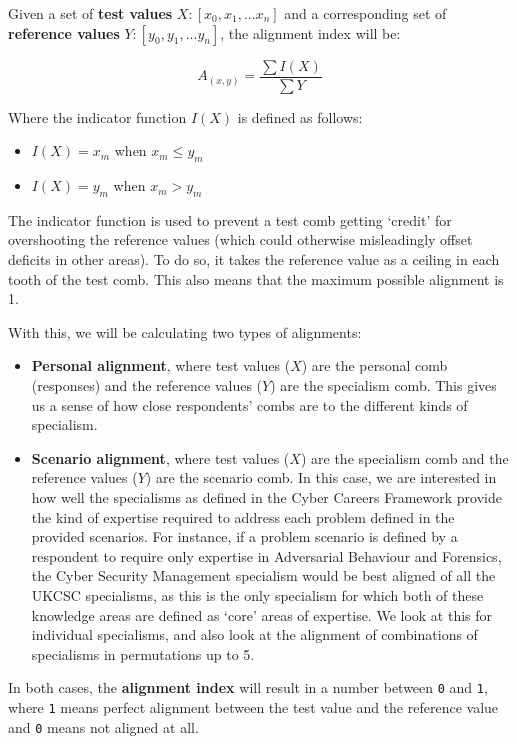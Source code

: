 \documentclass[
  a4paper,
]{book}
\providecommand{\tightlist}{%
  \setlength{\itemsep}{0pt}\setlength{\parskip}{0pt}}
\begin{document}
Given a set of \textbf{test values} \(X:[x_0, x_1, ... x_n ]\) and a
corresponding set of \textbf{reference values}
\(Y:[y_0, y_1, ... y_n ]\), the alignment index will be:

\[
A_{(x,y)} = \frac{\sum I(X)}{\sum Y}
\]

Where the indicator function \(I(X)\) is defined as follows:

\begin{itemize}
\tightlist
\item
  \(I(X) = x_m\) when \(x_m \leq y_m\)
\item
  \(I(X) = y_m\) when \(x_m > y_m\)
\end{itemize}

The indicator function is used to prevent a test comb getting `credit'
for overshooting the reference values (which could otherwise
misleadingly offset deficits in other areas). To do so, it takes the
reference value as a ceiling in each tooth of the test comb. This also
means that the maximum possible alignment is 1.

With this, we will be calculating two types of alignments:

\begin{itemize}
\item
  \textbf{Personal alignment}, where test values (\(X\)) are the
  personal comb (responses) and the reference values (\(Y\)) are the
  specialism comb. This gives us a sense of how close respondents' combs
  are to the different kinds of specialism.
\item
  \textbf{Scenario alignment}, where test values (\(X\)) are the
  specialism comb and the reference values (\(Y\)) are the scenario
  comb. In this case, we are interested in how well the specialisms as
  defined in the Cyber Careers Framework provide the kind of expertise
  required to address each problem defined in the provided scenarios.
  For instance, if a problem scenario is defined by a respondent to
  require only expertise in Adversarial Behaviour and Forensics, the
  Cyber Security Management specialism would be best aligned of all the
  UKCSC specialisms, as this is the only specialism for which both of
  these knowledge areas are defined as `core' areas of expertise. We
  look at this for individual specialisms, and also look at the
  alignment of combinations of specialisms in permutations up to 5.
\end{itemize}

In both cases, the \textbf{alignment index} will result in a number
between \texttt{0} and \texttt{1}, where \texttt{1} means perfect
alignment between the test value and the reference value and \texttt{0}
means not aligned at all.
\end{document}

